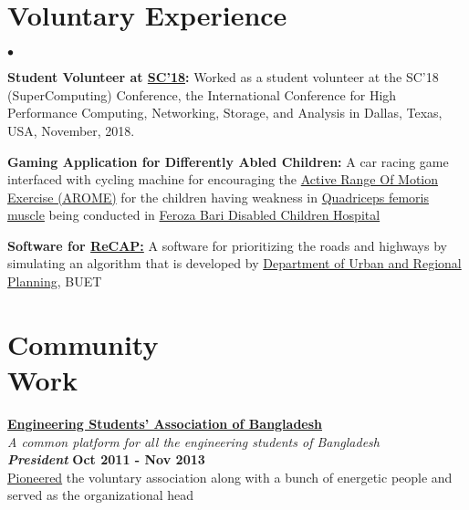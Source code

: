 \documentclass[margin,line]{res}
\newenvironment{list2}{
  \begin{list}{$\bullet$}{%
      \setlength{\itemsep}{0in}
      \setlength{\parsep}{0in} \setlength{\parskip}{0in}
      \setlength{\topsep}{0in} \setlength{\partopsep}{0in} 
      \setlength{\leftmargin}{0.2in}}}{\end{list}}
\begin{document}
\begin{resume}
\section{\sc Voluntary Experience}
\begin{list2}
\item {\bf {Student Volunteer at \href{https://sc18.supercomputing.org/}{SC'18}:}} Worked as a student volunteer at the SC'18 (SuperComputing) Conference, the International Conference for High Performance Computing, Networking, Storage, and Analysis in Dallas, Texas, USA, November, 2018.
\item {\bf {Gaming Application for Differently Abled Children:}} A car racing game interfaced with cycling machine for encouraging the \href{http://www.physiotherapynotes.com/2011/07/physiotherapy-exercises-types.html}{Active Range Of Motion Exercise (AROME)} for the children having weakness in \href{https://en.wikipedia.org/wiki/Quadriceps_femoris_muscle}{Quadriceps femoris muscle} being conducted in \href{http://www.bccw-bd.org/information_about.html}{Feroza Bari Disabled Children Hospital}
\item {\bf Software for \href{http://www.research4cap.org/SitePages/Home.aspx}{ReCAP:}} A software for prioritizing the roads and highways by simulating an algorithm that is developed by \href{http://urp.buet.ac.bd/}{Department of Urban and Regional Planning}, BUET
\end{list2}

\vspace*{-.1in}

\section{\sc Community \\Work}
{\bf \href{http://www.esab.org.bd/}{Engineering Students' Association of Bangladesh}} \\
\textit{A common platform for all the engineering students of Bangladesh \\}
\textbf{{\em President}} \hfill {\bf Oct 2011 - Nov 2013}\\
\href{https://www.youtube.com/watch?v=2GRKcrF47gM}{Pioneered} the voluntary association along with a bunch of energetic people and served as the organizational head

\end{resume}
\end{document}
